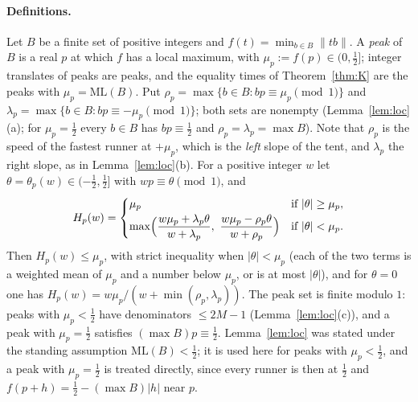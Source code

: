 \documentclass[11pt]{article}
\theoremstyle{definition}
\theoremstyle{remark}
\newcommand{\nd}[1]{\lVert #1\rVert}
\newcommand{\ML}{\mathrm{ML}}
\begin{document}
\paragraph{Definitions.}
Let $B$ be a finite set of positive integers and $f(t)=\min_{b\in B}\nd{tb}$. A \emph{peak} of $B$ is a real $p$ at which $f$ has a local maximum, with $\mu_p:=f(p)\in(0,\frac12]$; integer translates of peaks are peaks, and the equality times of Theorem~\ref{thm:K} are the peaks with $\mu_p=\ML(B)$. Put $\rho_p=\max\{b\in B: bp\equiv\mu_p\pmod1\}$ and $\lambda_p=\max\{b\in B:bp\equiv-\mu_p\pmod1\}$; both sets are nonempty (Lemma~\ref{lem:loc}(a); for $\mu_p=\frac12$ every $b\in B$ has $bp\equiv\frac12$ and $\rho_p=\lambda_p=\max B$). Note that $\rho_p$ is the speed of the fastest runner at $+\mu_p$, which is the \emph{left} slope of the tent, and $\lambda_p$ the right slope, as in Lemma~\ref{lem:loc}(b). For a positive integer $w$ let $\theta=\theta_p(w)\in(-\frac12,\frac12]$ with $wp\equiv\theta\pmod1$, and
\[
H_p(w)=\begin{cases}\mu_p&\text{if }|\theta|\ge\mu_p,\\[2pt]\max\Bigl(\dfrac{w\mu_p+\lambda_p\theta}{w+\lambda_p},\ \dfrac{w\mu_p-\rho_p\theta}{w+\rho_p}\Bigr)&\text{if }|\theta|<\mu_p.\end{cases}
\]
Then $H_p(w)\le\mu_p$, with strict inequality when $|\theta|<\mu_p$ (each of the two terms is a weighted mean of $\mu_p$ and a number below $\mu_p$, or is at most $|\theta|$), and for $\theta=0$ one has $H_p(w)=w\mu_p/(w+\min(\rho_p,\lambda_p))$. The peak set is finite modulo $1$: peaks with $\mu_p<\frac12$ have denominators $\le2M-1$ (Lemma~\ref{lem:loc}(c)), and a peak with $\mu_p=\frac12$ satisfies $(\max B)p\equiv\frac12$. Lemma~\ref{lem:loc} was stated under the standing assumption $\ML(B)<\frac12$; it is used here for peaks with $\mu_p<\frac12$, and a peak with $\mu_p=\frac12$ is treated directly, since every runner is then at $\frac12$ and $f(p+h)=\frac12-(\max B)|h|$ near $p$.
\end{document}
